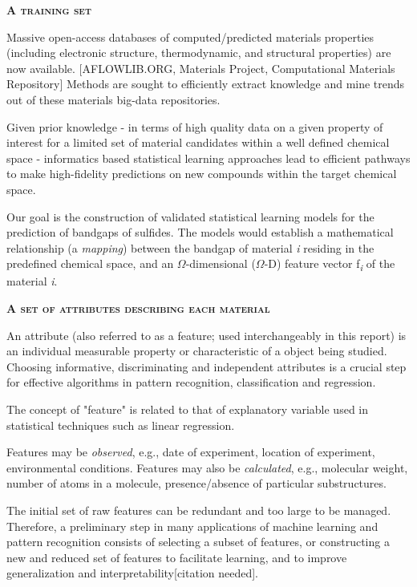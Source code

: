 \documentclass[10pt, letter]{report}
\renewcommand{\=}{\, =\, }
\newcommand{\+}{\, +\, }
\renewcommand{\-}{\, -\, }
\begin{document}
\textsc{\textbf{A training set}}

Massive open-access databases of computed/predicted materials properties (including electronic structure, thermodynamic, and structural properties) are now available. [AFLOWLIB.ORG, Materials Project, Computational Materials Repository] Methods are sought to efficiently extract knowledge and mine trends out of these materials big-data repositories.

Given prior knowledge - in terms of high quality data on a given property of interest for a limited set of material candidates within a well defined chemical space - informatics based statistical learning approaches lead to efficient pathways to make high-fidelity predictions on new compounds within the target chemical space.

Our goal is the construction of validated statistical learning models for the prediction of bandgaps of sulfides. The models would establish a mathematical relationship (a \textit{mapping}) between the bandgap of material \textit{i} residing in the predefined chemical space, and an \(\Omega\)-dimensional (\(\Omega\)-D) feature vector f\textsubscript{\textit{i}} of the material \textit{i}.

\textsc{\textbf{A set of attributes describing each material}}

An attribute (also referred to as a feature; used interchangeably in this report) is an individual measurable property or characteristic of a object being studied. Choosing informative, discriminating and independent attributes is a crucial step for effective algorithms in pattern recognition, classification and regression.

The concept of "feature" is related to that of explanatory variable used in statistical techniques such as linear regression.

Features may be \textit{observed}, e.g., date of experiment, location of experiment, environmental conditions. Features may also be \textit{calculated}, e.g., molecular weight, number of atoms in a molecule, presence/absence of particular substructures.

The initial set of raw features can be redundant and too large to be managed. Therefore, a preliminary step in many applications of machine learning and pattern recognition consists of selecting a subset of features, or constructing a new and reduced set of features to facilitate learning, and to improve generalization and interpretability[citation needed].
\end{document}
